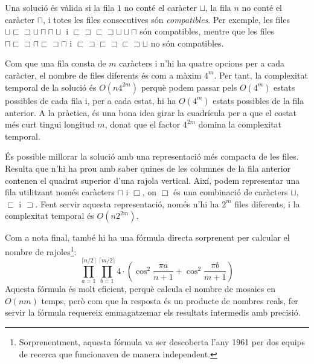 Una solució és vàlida si la fila $1$ no conté
el caràcter $\sqcup$,
la fila $n$ no conté el caràcter $\sqcap$,
i totes les files consecutives són \emph{compatibles}.
Per exemple, les files
$\sqcup \sqsubset \sqsupset \sqcup \sqcap \sqcap \sqcup$ i
$\sqsubset \sqsupset \sqsubset \sqsupset \sqcup \sqcup \sqcap$
són compatibles, mentre que les files
$\sqcap \sqsubset \sqsupset \sqcap \sqsubset \sqsupset \sqcap$ i
$\sqsubset \sqsupset \sqsubset \sqsupset \sqsubset \sqsupset \sqcup$
no són compatibles.

Com que una fila consta de $m$ caràcters i n'hi ha
quatre opcions per a cada caràcter, el nombre de files diferents
és com a màxim $4^m$.
Per tant, la complexitat temporal de la solució és
$O(n 4^{2m})$ perquè podem passar pels
$O(4^m)$ estats possibles de cada fila
i, per a cada estat, hi ha $O(4^m)$
estats possibles de la fila anterior.
A la pràctica, és una bona idea girar la cuadrícula
per a que el costat més curt tingui longitud $m$,
donat que el factor $4^{2m}$ domina la complexitat temporal.

És possible millorar la solució amb una
representació més compacta de les files.
Resulta que n'hi ha prou amb saber quines
de les columnes de la fila anterior contenen el quadrat superior
d'una rajola vertical.
Així, podem representar una fila utilitzant només caràcters
$\sqcap$ i $\Box$, on $\Box$ és una combinació
de caràcters
$\sqcup$, $\sqsubset$ i $\sqsupset$.
Fent servir aquesta representació, només n'hi ha
$2^m$ files diferents, i la complexitat temporal és
$O(n 2^{2m})$.

Com a nota final, també hi ha una fórmula directa sorprenent
per calcular el nombre de rajoles\footnote{Sorprenentment,
aquesta fórmula va ser descoberta l'any 1961 per dos equips de recerca \cite{kas61,tem61}
que funcionaven de manera independent.}:
\[ \prod_{a=1}^{\lceil n/2 \rceil} \prod_{b=1}^{\lceil m/2 \rceil} 4 \cdot (\cos^2 \frac{\pi a }{n + 1} + \cos^2 \frac{\pi b}{m+1})\]
Aquesta fórmula és molt eficient, perquè calcula
el nombre de mosaics en $O(nm)$ temps,
però com que la resposta és un producte de nombres reals,
fer servir la fórmula requereix 
emmagatzemar els resultats intermedis amb precisió.
